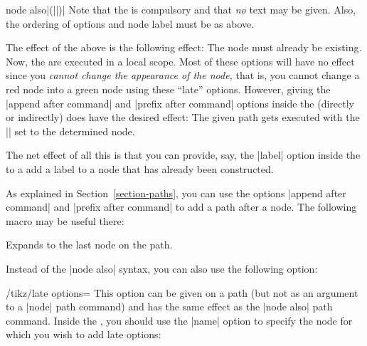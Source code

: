 \begin{pathoperation}{node also}{|(||)|}
    Note that the  is compulsory and that \emph{no} text may be
    given. Also, the ordering of options and node label must be as above.

    The effect of the above is the following effect: The node  must
    already  be existing. Now, the  are executed in a local
    scope. Most of these options will have no effect since you \emph{cannot
    change the appearance of the node,} that is, you cannot change a red node
    into a green node using these ``late'' options. However, giving the
    |append after command| and |prefix after command| options inside the
     (directly or indirectly) does have the desired effect:
    The given path gets executed with the |\tikzlastnode| set to the determined
    node.

    The net effect of all this is that you can provide, say, the |label| option
    inside the  to a add a label to a node that has already been
    constructed.
\begin{codeexample}[]
\end{codeexample}
\end{pathoperation}

As explained in Section~\ref{section-paths}, you can use the options
|append after command| and |prefix after command| to add a path after a node.
The following macro may be useful there:
%
\begin{command}{\tikzlastnode}
    Expands to the last node on the path.
\end{command}

Instead of the |node also| syntax, you can also use the following option:

\begin{key}{/tikz/late options=}
    This option can be given on a path (but not as an argument to a |node| path
    command) and has the same effect as the |node also| path command. Inside
    the , you should use the |name| option to specify the node
    for which you wish to add late options:
\begin{codeexample}[]
\end{codeexample}
\end{key}



